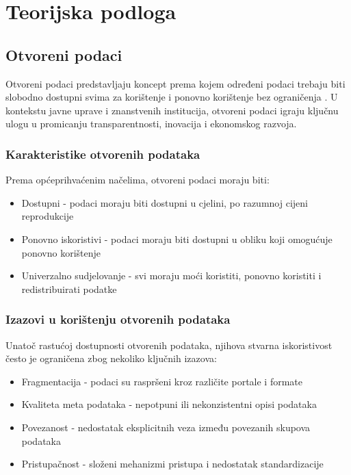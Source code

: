 \chapter{Teorijska podloga}
\label{ch:background}


\section{Otvoreni podaci}
\label{sec:open_data}

Otvoreni podaci predstavljaju koncept prema kojem određeni podaci trebaju biti slobodno 
dostupni svima za korištenje i ponovno korištenje bez ograničenja \cite{janssen2012benefits}. 
U kontekstu javne uprave i znanstvenih institucija, otvoreni podaci igraju ključnu ulogu 
u promicanju transparentnosti, inovacija i ekonomskog razvoja.

\subsection{Karakteristike otvorenih podataka}
Prema općeprihvaćenim načelima, otvoreni podaci moraju biti:
\begin{itemize}
    \item Dostupni - podaci moraju biti dostupni u cjelini, po razumnoj cijeni reprodukcije
    \item Ponovno iskoristivi - podaci moraju biti dostupni u obliku koji omogućuje ponovno korištenje
    \item Univerzalno sudjelovanje - svi moraju moći koristiti, ponovno koristiti i redistribuirati podatke
\end{itemize}

\subsection{Izazovi u korištenju otvorenih podataka}
Unatoč rastućoj dostupnosti otvorenih podataka, njihova stvarna iskoristivost često je 
ograničena zbog nekoliko ključnih izazova:
\begin{itemize}
    \item Fragmentacija - podaci su raspršeni kroz različite portale i formate
    \item Kvaliteta meta podataka - nepotpuni ili nekonzistentni opisi podataka
    \item Povezanost - nedostatak eksplicitnih veza između povezanih skupova podataka
    \item Pristupačnost - složeni mehanizmi pristupa i nedostatak standardizacije
\end{itemize}

